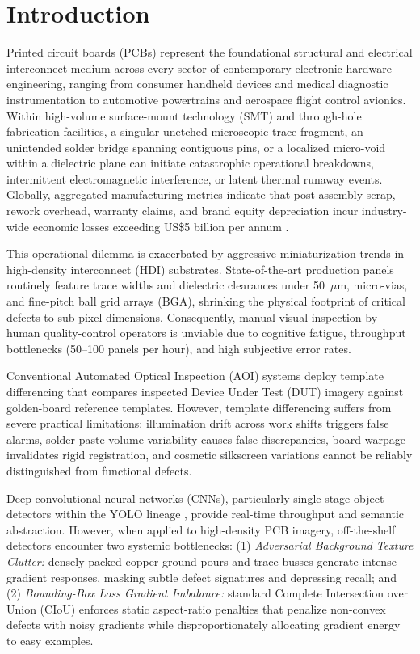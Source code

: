\documentclass{llncs}
\begin{document}
\section{Introduction}
Printed circuit boards (PCBs) represent the foundational structural and electrical interconnect medium across every sector of contemporary electronic hardware engineering, ranging from consumer handheld devices and medical diagnostic instrumentation to automotive powertrains and aerospace flight control avionics. Within high-volume surface-mount technology (SMT) and through-hole fabrication facilities, a singular unetched microscopic trace fragment, an unintended solder bridge spanning contiguous pins, or a localized micro-void within a dielectric plane can initiate catastrophic operational breakdowns, intermittent electromagnetic interference, or latent thermal runaway events. Globally, aggregated manufacturing metrics indicate that post-assembly scrap, rework overhead, warranty claims, and brand equity depreciation incur industry-wide economic losses exceeding US\$5 billion per annum \cite{ipc2017rework}.

This operational dilemma is exacerbated by aggressive miniaturization trends in high-density interconnect (HDI) substrates. State-of-the-art production panels routinely feature trace widths and dielectric clearances under 50~$\mu$m, micro-vias, and fine-pitch ball grid arrays (BGA), shrinking the physical footprint of critical defects to sub-pixel dimensions. Consequently, manual visual inspection by human quality-control operators is unviable due to cognitive fatigue, throughput bottlenecks (50--100 panels per hour), and high subjective error rates.

Conventional Automated Optical Inspection (AOI) systems deploy template differencing that compares inspected Device Under Test (DUT) imagery against golden-board reference templates. However, template differencing suffers from severe practical limitations: illumination drift across work shifts triggers false alarms, solder paste volume variability causes false discrepancies, board warpage invalidates rigid registration, and cosmetic silkscreen variations cannot be reliably distinguished from functional defects.

Deep convolutional neural networks (CNNs), particularly single-stage object detectors within the YOLO lineage \cite{jocher2022yolov5,wang2023yolov7,jocher2023yolov8}, provide real-time throughput and semantic abstraction. However, when applied to high-density PCB imagery, off-the-shelf detectors encounter two systemic bottlenecks: (1) \textit{Adversarial Background Texture Clutter:} densely packed copper ground pours and trace busses generate intense gradient responses, masking subtle defect signatures and depressing recall; and (2) \textit{Bounding-Box Loss Gradient Imbalance:} standard Complete Intersection over Union (CIoU) \cite{zheng2022ciou} enforces static aspect-ratio penalties that penalize non-convex defects with noisy gradients while disproportionately allocating gradient energy to easy examples.
\end{document}
